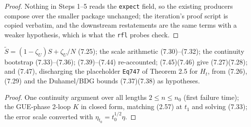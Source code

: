 \begin{proof}\leanok
  Nothing in Steps 1--5 reads the \texttt{expect} field, so the existing producers compose over the
  smaller package unchanged; the iteration's proof script is copied verbatim, and the downstream
  restatements are the same terms with a weaker hypothesis, which is what the \texttt{rfl} probes
  check.
\end{proof}

\begin{theorem}\label{thm:7.2-gue}
  \leanok{}
  $\tilde S=(1-\zeta_U)S+\zeta_U/N$ (7.25); the scale arithmetic (7.30)--(7.32); the continuity
  bootstrap (7.33)--(7.36); (7.39)--(7.44) re-accounted; (7.45)(7.46) give (7.27)(7.28); and (7.47),
  discharging the placeholder \texttt{Eq747} of Theorem 2.5 for $H_t$, from (7.26), (7.29) and the
  Duhamel/BDG bounds (7.37)(7.38) as hypotheses.
\end{theorem}
\begin{proof}\leanok
  One continuity argument over all lengths $2\le n\le n_0$ (first failure time); the GUE-phase 2-loop
  $K$ in closed form, matching (2.57) at $t_1$ and solving (7.33); the error scale converted with
  $\eta_{t_0}=t_0^{1/2}\eta$.
\end{proof}

